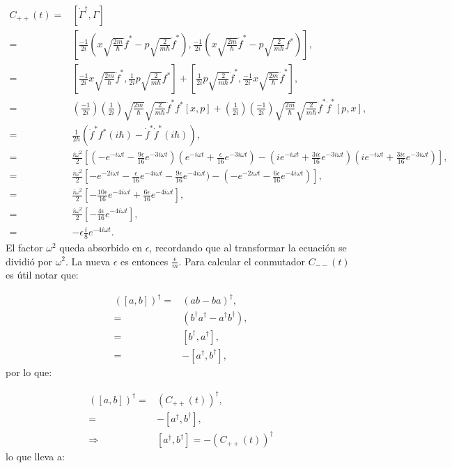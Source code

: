 \documentclass[a4paper,10pt]{report}
\begin{document}
\begin{align*}
C_{++}(t) =& [\dot{\Gamma}^\dagger,\Gamma]\\
 =&[\frac{-1}{2i}(x\sqrt{\frac{2m}{\hbar}}\ddot{f}^*-p\sqrt{\frac{2}{m\hbar}}\dot{f}^*),\frac{-1}{2i}(x\sqrt{\frac{2m}{\hbar}}\dot{f}^*-p\sqrt{\frac{2}{m\hbar}}f^*)],\\
 =&[\frac{-1}{2i}x\sqrt{\frac{2m}{\hbar}}\ddot{f}^*,\frac{1}{2i}p\sqrt{\frac{2}{m\hbar}}f^*]+[\frac{1}{2i}p\sqrt{\frac{2}{m\hbar}}\dot{f}^*,\frac{-1}{2i}x\sqrt{\frac{2m}{\hbar}}\dot{f}^*],\\
 =&(\frac{-1}{2i})(\frac{1}{2i})\sqrt{\frac{2m}{\hbar}}\sqrt{\frac{2}{m\hbar}}\ddot{f}^*f^*[x,p]+(\frac{1}{2i})(\frac{-1}{2i})\sqrt{\frac{2m}{\hbar}}\sqrt{\frac{2}{m\hbar}}\dot{f}^*\dot{f}^*[p,x],\\
 =&\frac{1}{2\hbar}(\ddot{f}^*f^*(i\hbar)-\dot{f}^*\dot{f}^*(i\hbar)),\\
 =&\frac{i\omega^2}{2}[(-e^{-i\omega t}-\frac{9\epsilon}{16}e^{-3i\omega t})(e^{-i\omega t}+\frac{\epsilon}{16}e^{-3i\omega t})-(ie^{-i\omega t}+\frac{3i\epsilon}{16}e^{-3i\omega t})(ie^{-i\omega t}+\frac{3i\epsilon}{16}e^{-3i\omega t})],\\ 
 =&\frac{i\omega^2}{2}[-e^{-2i\omega t}-\frac{\epsilon}{16}e^{-4i\omega t}-\frac{9\epsilon}{16}e^{-4i\omega t})-(-e^{-2i\omega t}-\frac{6\epsilon}{16}e^{-4i\omega t})],\\
 =&\frac{i\omega^2}{2}[-\frac{10\epsilon}{16}e^{-4i\omega t}+\frac{6\epsilon}{16}e^{-4i\omega t}],\\
 =&\frac{i\omega^2}{2}[-\frac{4\epsilon}{16}e^{-4i\omega t}],\\
 =&-\epsilon\frac{i}{8}e^{-4i\omega t}.
\end{align*} El factor $\omega^2$ queda absorbido en $\epsilon$, recordando que al transformar la ecuación se dividió por $\omega^2$. La nueva $\epsilon$ es entonces $\frac{\epsilon}{m}$. Para calcular el conmutador $C_{--}(t)$ es útil notar que:

\begin{align*}
([a,b])^{\dagger} =& (ab-ba)^{\dagger}, \\
=& (b^{\dagger}a^{\dagger}-a^{\dagger}b^{\dagger}),\\
=& [b^{\dagger},a^{\dagger}],\\
=& -[a^{\dagger},b^{\dagger}], 
\end{align*} por lo que:

\begin{align*}
([a,b])^{\dagger} =& (C_{++}(t))^{\dagger},\\
=& -[a^{\dagger},b^{\dagger}],\\
\Rightarrow & [a^{\dagger},b^{\dagger}] = -(C_{++}(t))^{\dagger}
\end{align*} lo que lleva a:
\end{document}

